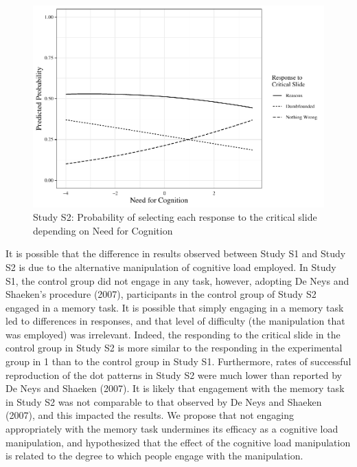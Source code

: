 \documentclass[
  american,
  man,floatsintext]{apa7}
\begin{document}
\begin{figure}[!h]
\includegraphics{Supplementary_files/figure-latex/S2ggplotlogit2-1} \caption{Study S2: Probability of selecting each response to the critical slide depending on Need for Cognition}\label{fig:S2ggplotlogit2}
\end{figure}

It is possible that the difference in results observed between Study S1 and Study S2 is due to the alternative manipulation of cognitive load employed. In Study S1, the control group did not engage in any task, however, adopting De Neys and Shaeken's procedure (2007), participants in the control group of Study S2 engaged in a memory task. It is possible that simply engaging in a memory task led to differences in responses, and that level of difficulty (the manipulation that was employed) was irrelevant. Indeed, the responding to the critical slide in the control group in Study S2 is more similar to the responding in the experimental group in 1 than to the control group in Study S1. Furthermore, rates of successful reproduction of the dot patterns in Study S2 were much lower than reported by De Neys and Shaeken (2007). It is likely that engagement with the memory task in Study S2 was not comparable to that observed by De Neys and Shaeken (2007), and this impacted the results. We propose that not engaging appropriately with the memory task undermines its efficacy as a cognitive load manipulation, and hypothesized that the effect of the cognitive load manipulation is related to the degree to which people engage with the manipulation.
\end{document}
